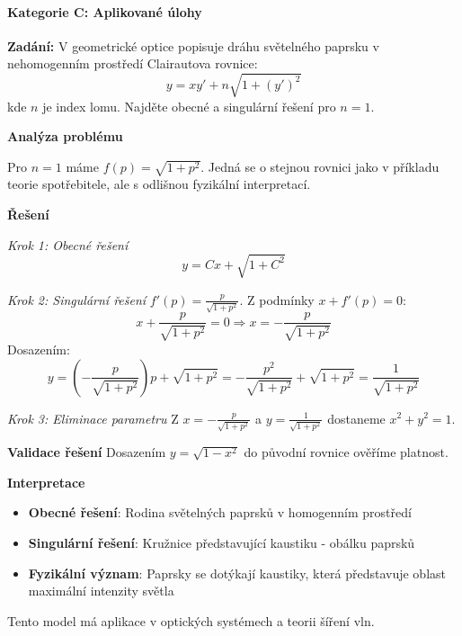 \paragraph*{Kategorie C: Aplikované úlohy}

\begin{example}
\label{ex:optika-clairaut}

\noindent\textbf{Zadání:} V geometrické optice popisuje dráhu světelného paprsku v nehomogenním prostředí Clairautova rovnice:
\[
y = xy' + n\sqrt{1 + (y')^2}
\]
kde $n$ je index lomu. Najděte obecné a singulární řešení pro $n = 1$.

\vspace{1.5\baselineskip}

\noindent\textbf{Analýza problému}

Pro $n = 1$ máme $f(p) = \sqrt{1 + p^2}$. Jedná se o stejnou rovnici jako v příkladu teorie spotřebitele, ale s odlišnou fyzikální interpretací.

\vspace{1.5\baselineskip}

\noindent\textbf{Řešení}

\noindent\textit{Krok 1: Obecné řešení}
\[
y = Cx + \sqrt{1 + C^2}
\]

\vspace{1\baselineskip}

\noindent\textit{Krok 2: Singulární řešení}
$f'(p) = \frac{p}{\sqrt{1 + p^2}}$. Z podmínky $x + f'(p) = 0$:
\[
x + \frac{p}{\sqrt{1 + p^2}} = 0 \Rightarrow x = -\frac{p}{\sqrt{1 + p^2}}
\]
Dosazením:
\[
y = \left(-\frac{p}{\sqrt{1 + p^2}}\right)p + \sqrt{1 + p^2} = -\frac{p^2}{\sqrt{1 + p^2}} + \sqrt{1 + p^2} = \frac{1}{\sqrt{1 + p^2}}
\]

\vspace{1\baselineskip}

\noindent\textit{Krok 3: Eliminace parametru}
Z $x = -\frac{p}{\sqrt{1 + p^2}}$ a $y = \frac{1}{\sqrt{1 + p^2}}$ dostaneme $x^2 + y^2 = 1$.

\vspace{1.5\baselineskip}

\noindent\textbf{Validace řešení}
Dosazením $y = \sqrt{1 - x^2}$ do původní rovnice ověříme platnost.

\vspace{1.5\baselineskip}

\noindent\textbf{Interpretace}
\begin{itemize}
\item \textbf{Obecné řešení}: Rodina světelných paprsků v homogenním prostředí
\item \textbf{Singulární řešení}: Kružnice představující kaustiku - obálku paprsků
\item \textbf{Fyzikální význam}: Paprsky se dotýkají kaustiky, která představuje oblast maximální intenzity světla
\end{itemize}
Tento model má aplikace v optických systémech a teorii šíření vln.

\end{example}

